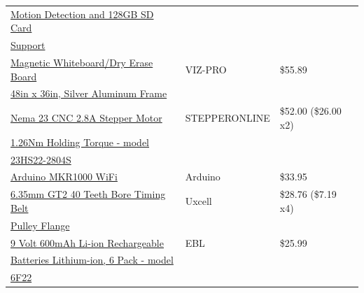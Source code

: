 \begin{table} [H]
\begin{tabular}{|l|l|l|}
		\href{https://www.amazon.com/dp/B07789DM4R/?coliid=I1G2VVNW6NF88L&colid=22YAOKWOJAKA9&psc=0&ref_=lv_ov_lig_dp_it}{Motion Detection and 128GB SD Card}			&				&	\\
		\href{https://www.amazon.com/dp/B07789DM4R/?coliid=I1G2VVNW6NF88L&colid=22YAOKWOJAKA9&psc=0&ref_=lv_ov_lig_dp_it}{ Support}						&				&	\\
		\hline
		\href{https://www.amazon.com/dp/B01LWQ5K9K/?coliid=I2CQSP60ATX4U6&colid=22YAOKWOJAKA9&psc=0&ref_=lv_ov_lig_dp_it}{Magnetic Whiteboard/Dry Erase Board}	& VIZ-PRO 		& \$55.89 \\
		\href{https://www.amazon.com/dp/B01LWQ5K9K/?coliid=I2CQSP60ATX4U6&colid=22YAOKWOJAKA9&psc=0&ref_=lv_ov_lig_dp_it}{48in x 36in, Silver Aluminum Frame}	&				&	\\
		\hline
		\href{https://www.amazon.com/dp/B00PNEPF5I/?coliid=I3APKEM9Y17HEP&colid=22YAOKWOJAKA9&psc=0&ref_=lv_ov_lig_dp_it}{Nema 23 CNC 2.8A Stepper Motor} 		& STEPPERONLINE	& \$52.00 (\$26.00 x2) \\
		\href{https://www.amazon.com/dp/B00PNEPF5I/?coliid=I3APKEM9Y17HEP&colid=22YAOKWOJAKA9&psc=0&ref_=lv_ov_lig_dp_it}{1.26Nm Holding Torque - model}		&				&	\\
		\href{https://www.amazon.com/dp/B00PNEPF5I/?coliid=I3APKEM9Y17HEP&colid=22YAOKWOJAKA9&psc=0&ref_=lv_ov_lig_dp_it}{23HS22-2804S}						&				&	\\
		\hline
		\href{https://www.amazon.com/gp/product/B071LRYYHH/ref=ppx_yo_dt_b_asin_title_o00__o00_s02?ie=UTF8&psc=1}{Arduino MKR1000 WiFi} 	& Arduino	& \$33.95 \\
		\hline
	    \href{https://www.amazon.com/dp/B0728PDWY5/?coliid=I3K7SWFRMQ3A2F&colid=22YAOKWOJAKA9&psc=0&ref_=lv_ov_lig_dp_it}{6.35mm GT2 40 Teeth Bore Timing Belt}& Uxcell 		& \$28.76 (\$7.19 x4) \\
	    \href{https://www.amazon.com/dp/B0728PDWY5/?coliid=I3K7SWFRMQ3A2F&colid=22YAOKWOJAKA9&psc=0&ref_=lv_ov_lig_dp_it}{ Pulley Flange}							&				&	\\
		\hline
		\href{https://www.amazon.com/dp/B00GLK1BO2/?coliid=ICY9TJ3NF7CJT&colid=22YAOKWOJAKA9&ref_=lv_ov_lig_dp_it&th=1}{9 Volt 600mAh Li-ion Rechargeable}   & EBL 			& \$25.99 \\
		\href{https://www.amazon.com/dp/B00GLK1BO2/?coliid=ICY9TJ3NF7CJT&colid=22YAOKWOJAKA9&ref_=lv_ov_lig_dp_it&th=1}{Batteries Lithium-ion, 6 Pack - model}		&				&	\\
		\href{https://www.amazon.com/dp/B00GLK1BO2/?coliid=ICY9TJ3NF7CJT&colid=22YAOKWOJAKA9&ref_=lv_ov_lig_dp_it&th=1}{ 6F22}							&				&	\\

\end{tabular}
\end{table}
